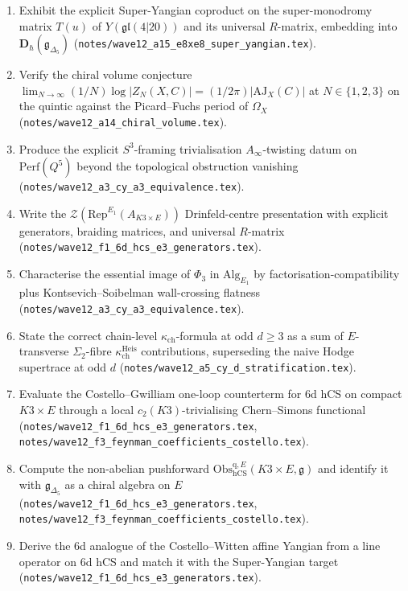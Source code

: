 \documentclass[11pt]{article}
\providecommand{\kch}{\kappa_{\mathrm{ch}}}
\providecommand{\Eone}{E_1}
\providecommand{\hCS}{\mathrm{hCS}}
\providecommand{\AJ}{\mathrm{AJ}}
\providecommand{\fg}{\mathfrak{g}}
\providecommand{\fgl}{\mathfrak{gl}}
\providecommand{\Perf}{\mathrm{Perf}}
\providecommand{\Obs}{\mathrm{Obs}}
\begin{document}
\begin{enumerate}[leftmargin=2em]
\item Exhibit the explicit Super-Yangian coproduct on the
super-monodromy matrix $T(u)$ of $Y(\fgl(4|20))$ and its universal
$R$-matrix, embedding into $\mathbf{D}_\hbar(\fg_{\Delta_5})$
(\texttt{notes/wave12\_a15\_e8xe8\_super\_yangian.tex}).

\item Verify the chiral volume conjecture
$\lim_{N \to \infty} (1/N) \log |Z_N(X, C)| = (1/2\pi) |\AJ_X(C)|$ at
$N \in \{1, 2, 3\}$ on the quintic against the Picard--Fuchs period
of $\Omega_X$
(\texttt{notes/wave12\_a14\_chiral\_volume.tex}).

\item Produce the explicit $S^3$-framing trivialisation
$A_\infty$-twisting datum on $\Perf(Q^5)$ beyond the topological
obstruction vanishing
(\texttt{notes/wave12\_a3\_cy\_a3\_equivalence.tex}).

\item Write the $\mathcal{Z}(\mathrm{Rep}^{\Eone}(A_{K3 \times E}))$
Drinfeld-centre presentation with explicit generators, braiding
matrices, and universal $R$-matrix
(\texttt{notes/wave12\_f1\_6d\_hcs\_e3\_generators.tex}).

\item Characterise the essential image of $\Phi_3$ in
$\mathrm{Alg}_{\Eone}$ by factorisation-compatibility plus
Kontsevich--Soibelman wall-crossing flatness
(\texttt{notes/wave12\_a3\_cy\_a3\_equivalence.tex}).

\item State the correct chain-level $\kch$-formula at odd $d \geq 3$
as a sum of $E$-transverse $\Sigma_2$-fibre $\kch^{\mathrm{Heis}}$
contributions, superseding the naive Hodge supertrace at odd $d$
(\texttt{notes/wave12\_a5\_cy\_d\_stratification.tex}).

\item Evaluate the Costello--Gwilliam one-loop counterterm for 6d
hCS on compact $K3 \times E$ through a local $c_2(K3)$-trivialising
Chern--Simons functional
(\texttt{notes/wave12\_f1\_6d\_hcs\_e3\_generators.tex},
\texttt{notes/wave12\_f3\_feynman\_coefficients\_costello.tex}).

\item Compute the non-abelian pushforward
$\Obs^{\mathrm{q}, E}_{\hCS}(K3 \times E, \fg)$ and identify it with
$\fg_{\Delta_5}$ as a chiral algebra on $E$
(\texttt{notes/wave12\_f1\_6d\_hcs\_e3\_generators.tex},
\texttt{notes/wave12\_f3\_feynman\_coefficients\_costello.tex}).

\item Derive the 6d analogue of the Costello--Witten affine Yangian
from a line operator on 6d hCS and match it with the Super-Yangian
target
(\texttt{notes/wave12\_f1\_6d\_hcs\_e3\_generators.tex}).


\end{enumerate}
\end{document}
